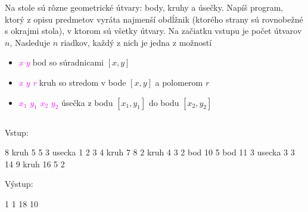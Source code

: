 \begin{uloha}
  Na stole sú rôzne geometrické útvary: body, kruhy a úsečky.
  Napíš program, ktorý z opisu predmetov vyráta najmenší obdĺžnik (ktorého
  strany sú rovnobežné s okrajmi stola), v ktorom sú všetky útvary.
  Na začiatku vstupu je počet útvarov $n$, Nasleduje $n$ riadkov,
  každý z nich je jedna z možností

\begin{itemize}\itemsep=-1mm
    \item \textcolor{magenta}{ {\em x y}} 
      bod so súradnicami $[x,y]$
    \item \textcolor{magenta}{ {\em x y r}}
      kruh so stredom v bode $[x,y]$ a polomerom $r$
    \item \textcolor{magenta}{ $x_1$ $y_1$ $x_2$ $y_2$}
      úsečka z bodu $[x_1,y_1]$ do bodu $[x_2,y_2]$
\end{itemize}

\begin{column}{0.35}
Vstup:\\
\begin{outputBox}
8
kruh 5 5 3
usecka 1 2 3 4
kruh 7 8 2
kruh 4 3 2
bod 10 5
bod 11 3
usecka 3 3 14 9
kruh 16 5 2
\end{outputBox}

Výstup:\\
\begin{outputBox}
1 1 18 10
\end{outputBox}
\end{column}
\hfill
{}
\end{uloha}
